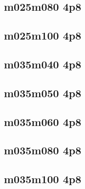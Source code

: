 \documentclass[pdftex,letterpaper,10pt]{article}
\begin{document}


\clearpage \subsection{m025m080 4p8}



\clearpage \subsection{m025m100 4p8}



\clearpage \subsection{m035m040 4p8}



\clearpage \subsection{m035m050 4p8}



\clearpage \subsection{m035m060 4p8}



\clearpage \subsection{m035m080 4p8}



\clearpage \subsection{m035m100 4p8}
\end{document}
